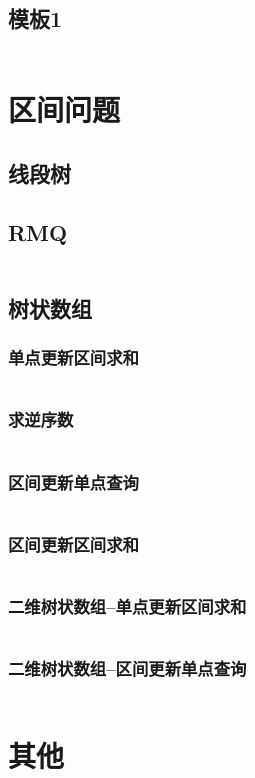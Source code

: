 \documentclass[a4paper,9pt]{article}
\begin{document}
\subsection{模板1}
\inputminted[]{c++}{Template/ComputingGeometry/template1.cpp}
\section{区间问题}
\subsection{线段树}

\subsection{RMQ}
\inputminted[]{c++}{Template/Segment/RMQ.cpp}
\subsection{树状数组}
\subsubsection{单点更新区间求和}
\inputminted[]{c++}{Template/Segment/TreeArrayI.cpp}
\subsubsection{求逆序数}
\inputminted[]{c++}{Template/Segment/Reverse.cpp}
\subsubsection{区间更新单点查询}
\inputminted[]{c++}{Template/Segment/TreeArrayII.cpp}
\subsubsection{区间更新区间求和}
\inputminted[]{c++}{Template/Segment/TreeArrayIII.cpp}
\subsubsection{二维树状数组--单点更新区间求和}
\inputminted[]{c++}{Template/Segment/TwoDimTreeArrayI.cpp}
\subsubsection{二维树状数组--区间更新单点查询}
\inputminted[]{c++}{Template/Segment/TwoDimTreeArrayII.cpp}

\section{其他}
\end{document}
